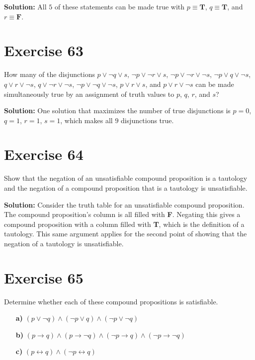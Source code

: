 \documentclass{Axon}
\begin{document}
\noindent
\textbf{Solution:}
All \(5\) of these statements can be made true with \(p \equiv \textbf{T}\), \(q \equiv \textbf{T}\), and \(r \equiv \textbf{F}\).

\section*{Exercise 63}
How many of the disjunctions \(p \lor \lnot q \lor s\), \(\lnot p \lor \lnot r \lor s\), \(\lnot p \lor \lnot r \lor \lnot s\), \(\lnot p \lor q \lor \lnot s\), \(q \lor r \lor \lnot s\), \(q \lor \lnot r \lor \lnot s\), \(\lnot p \lor \lnot q \lor \lnot s\), \(p \lor r \lor s\), and \(p \lor r \lor \lnot s\) can be made simultaneously true by an assignment of truth values to \(p\), \(q\), \(r\), and \(s\)?

\noindent
\textbf{Solution:}
One solution that maximizes the number of true disjunctions is \(p = 0\), \(q = 1\), \(r = 1\), \(s = 1\), which makes all \(9\) disjunctions true.

\section*{Exercise 64}
Show that the negation of an unsatisfiable compound proposition is a tautology and the negation of a compound proposition that is a tautology is unsatisfiable.

\noindent
\textbf{Solution:}
Consider the truth table for an unsatisfiable compound proposition. The compound proposition's column is all filled with \textbf{F}. Negating this gives a compound proposition with a column filled with \textbf{T}, which is the definition of a tautology. This same argument applies for the second point of showing that the negation of a tautology is unsatisfiable.

\section*{Exercise 65}
Determine whether each of these compound propositions is satisfiable.
\begin{enumerate}
    \item[\textbf{a)}] \((p \lor \lnot q) \land (\lnot p \lor q) \land (\lnot p \lor \lnot q)\)
    \item[\textbf{b)}] \((p \to q) \land (p \to \lnot q) \land (\lnot p \to q) \land (\lnot p \to \lnot q)\)
    \item[\textbf{c)}] \((p \leftrightarrow q) \land (\lnot p \leftrightarrow q)\)
\end{enumerate}
\end{document}
